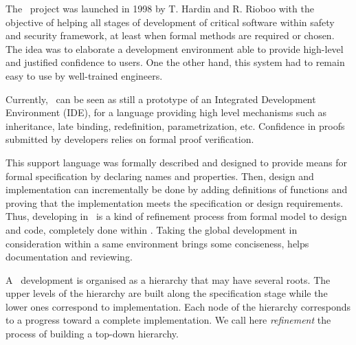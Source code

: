 


The \focal\ project was launched in 1998 by T. Hardin and R. Rioboo
\cite{HardinRiobooTSI04} with the 
objective of helping all stages of development of critical software
within safety and security framework, at least when formal methods are
required or chosen. The idea was to elaborate a development
environment able to provide high-level and justified confidence to
users. One the other hand, this system had to remain easy to use by
well-trained engineers.

Currently, \focal\ can be seen as still a prototype of an Integrated
Development Environment (IDE), for a language providing high level
mechanisms such as inheritance, late binding, redefinition,
parametrization, etc.  Confidence in proofs submitted by developers
relies on formal proof verification.

This support language was formally described and designed to provide
means for formal specification by declaring names and
properties. Then, design and implementation can incrementally be done
by adding definitions of functions and proving that the implementation
meets the specification or design requirements. Thus, developing in
\focal\ is a kind of refinement process from  formal model to design
and code, completely done within \focal. Taking the global development
in consideration within a same environment brings some conciseness,
helps documentation and reviewing.

A \focal\ development is organised as a hierarchy that may have
several roots. The upper levels of the hierarchy are built along the
specification stage while the lower ones correspond to
implementation. Each node of the hierarchy corresponds to a progress
toward a complete implementation.  We call here {\em refinement} the
process of building a top-down hierarchy.
